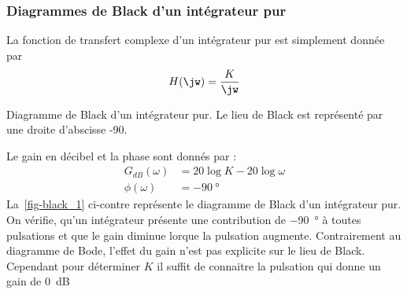 \subsubsection{Diagrammes de Black d'un intégrateur pur}
La fonction de transfert complexe d'un intégrateur
pur est simplement donnée par
\[
    H(\jw)=\dfrac{K}{\jw}
\]
\begin{marginfigure}
    \centering
    \resizebox{\linewidth}{!}{}
    \caption{Diagramme de Black d'un intégrateur pur. Le lieu de Black
             est représenté par une droite d'abscisse -90\degree.
             \label{fig-black_1}}
\end{marginfigure}
Le gain en décibel et la phase sont donnés par :
\begin{align*}
    G_{dB}(\omega)&=20\log{K}-20\log{\omega} \\
      \phi(\omega)&=-\SI{90}{\degree}
\end{align*}
La~\cref{fig-black_1} ci-contre représente le diagramme de Black d'un 
intégrateur pur. On vérifie, qu'un intégrateur présente une contribution 
de \SI{-90}{\degree} à toutes pulsations et que le gain diminue lorque la
pulsation augmente.
Contrairement au diagramme de Bode, l'effet du gain n'est pas
explicite sur le lieu de Black. Cependant pour déterminer $K$ il suffit de 
connaitre la pulsation qui donne un gain de \SI{0}{\dB}
